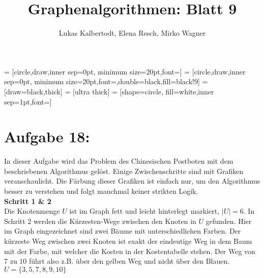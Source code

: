 \documentclass[11pt]{scrartcl} %
\title{Graphenalgorithmen: Blatt 9}
\author{Lukas Kalbertodt, Elena Resch, Mirko Wagner}
\begin{document}
\maketitle
{}
 = [circle,draw,inner sep=0pt, minimum size=20pt,font=\scriptsize]
 = [circle,draw,inner sep=0pt, minimum size=20pt,font=\scriptsize,double=black,fill=black!9]
 = [draw=black,thick]
 = [ultra thick]
 = [shape=circle, fill=white,inner sep=1pt,font=\scriptsize]
\section*{Aufgabe 18:}
In dieser Aufgabe wird das Problem des Chinesischen Postboten mit dem beschriebenen Algorithmus gelöst. Einige Zwischenschritte sind mit Grafiken veranschaulicht. Die Färbung dieser Grafiken ist einfach nur, um den Algorithmus besser zu verstehen und folgt manchmal keiner strikten Logik.\\

\textbf{\textsf{\large Schritt 1 \& 2}}\\
Die Knotenmenge $U$ ist im Graph fett und leicht hinterlegt markiert, $|U| = 6$. In Schritt 2 werden die Kürzesten-Wege zwischen den Knoten in $U$ gefunden. Hier im Graph eingezeichnet sind zwei Bäume mit unterschiedlichen Farben. Der kürzeste Weg zwischen zwei Knoten ist exakt der eindeutige Weg in dem Baum mit der Farbe, mit welcher die Kosten in der Kostentabelle stehen. Der Weg von $7$ zu $10$ führt also z.B. über den gelben Weg und nicht über den Blauen.\\

$U = \{3, 5, 7, 8, 9, 10\}$
\end{document}
